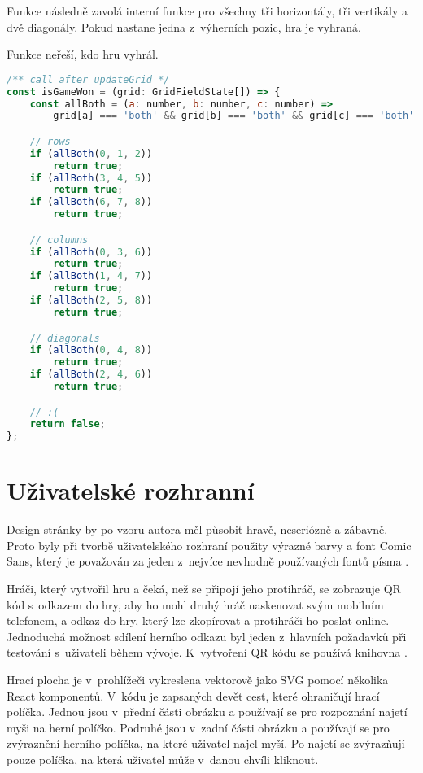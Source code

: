 Funkce  následně zavolá interní funkce  pro všechny tři
horizontály, tři vertikály a dvě diagonály. Pokud nastane jedna z~výherních
pozic, hra je vyhraná.

Funkce neřeší, kdo hru vyhrál.

\begin{lstlisting}[language=JavaScript,caption={Funkce \M{isGameWon}},label={lst:is-game-won}]
/** call after updateGrid */
const isGameWon = (grid: GridFieldState[]) => {
    const allBoth = (a: number, b: number, c: number) =>
        grid[a] === 'both' && grid[b] === 'both' && grid[c] === 'both';

    // rows
    if (allBoth(0, 1, 2))
        return true;
    if (allBoth(3, 4, 5))
        return true;
    if (allBoth(6, 7, 8))
        return true;

    // columns
    if (allBoth(0, 3, 6))
        return true;
    if (allBoth(1, 4, 7))
        return true;
    if (allBoth(2, 5, 8))
        return true;

    // diagonals
    if (allBoth(0, 4, 8))
        return true;
    if (allBoth(2, 4, 6))
        return true;

    // :(
    return false;
};
\end{lstlisting}

\section{Uživatelské rozhranní}\label{sec:user-interface}

Design stránky by po vzoru autora měl působit hravě, neseriózně a zábavně.
Proto byly při tvorbě uživatelského rozhraní použity výrazné barvy a font Comic
Sans, který je považován za jeden z~nejvíce nevhodně používaných fontů písma
\cite{seddon2011}.

Hráči, který vytvořil hru a čeká, než se připojí jeho protihráč, se zobrazuje
QR kód s~odkazem do hry, aby ho mohl druhý hráč naskenovat svým mobilním
telefonem, a odkaz do hry, který lze zkopírovat a protihráči ho poslat online.
Jednoduchá možnost sdílení herního odkazu byl jeden z~hlavních požadavků při
testování s~uživateli během vývoje. K~vytvoření QR kódu se používá knihovna
 \cite{react-qr}.

Hrací plocha je v~prohlížeči vykreslena vektorově jako SVG pomocí několika
React komponentů. V~kódu je zapsaných devět cest, které ohraničují hrací
políčka. Jednou jsou v~přední části obrázku a používají se pro rozpoznání
najetí myši na herní políčko. Podruhé jsou v~zadní části obrázku a používají se
pro zvýraznění herního políčka, na které uživatel najel myší. Po najetí se
zvýrazňují pouze políčka, na která uživatel může v~danou chvíli kliknout.
